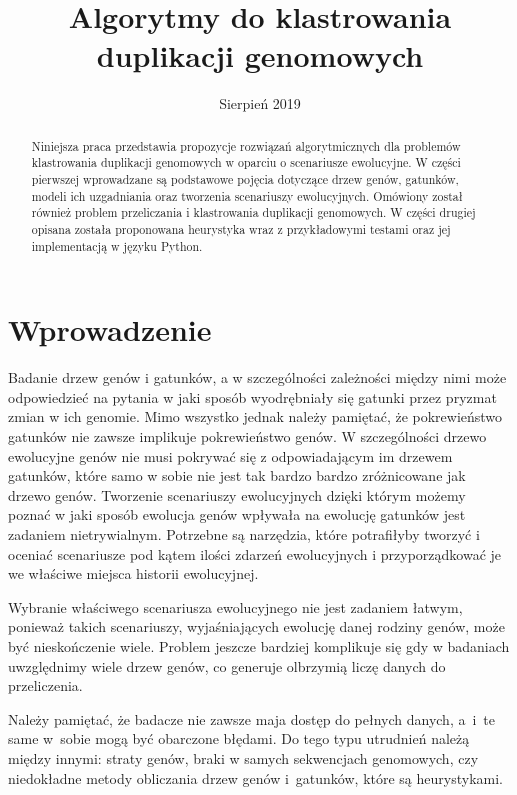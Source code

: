 \documentclass[licencjacka]{pracamgr}
\title{Algorytmy do klastrowania duplikacji genomowych}
\date{Sierpień 2019}
\begin{document}
\maketitle


\begin{abstract}
   Niniejsza praca przedstawia propozycje rozwiązań algorytmicznych dla problemów klastrowania duplikacji genomowych w oparciu o scenariusze ewolucyjne. W części pierwszej wprowadzane są podstawowe pojęcia dotyczące drzew genów, gatunków, modeli ich uzgadniania oraz tworzenia scenariuszy ewolucyjnych. Omówiony został również problem przeliczania i klastrowania duplikacji genomowych. W części drugiej opisana została proponowana heurystyka wraz z przykładowymi testami oraz jej implementacją w języku Python.
\end{abstract}


\renewcommand{\contentsname}{Spis Treści}
\tableofcontents

\chapter*{Wprowadzenie}


Badanie drzew genów i gatunków, a w szczególności zależności między nimi może odpowiedzieć na pytania w jaki sposób wyodrębniały się gatunki przez pryzmat zmian w ich genomie. Mimo wszystko jednak należy pamiętać, że pokrewieństwo gatunków nie zawsze implikuje pokrewieństwo genów. W szczególności drzewo ewolucyjne genów nie musi pokrywać się z odpowiadającym im drzewem gatunków, które samo w sobie nie jest tak bardzo bardzo zróżnicowane jak drzewo genów. Tworzenie scenariuszy ewolucyjnych dzięki którym możemy poznać w jaki sposób ewolucja genów wpływała na ewolucję gatunków jest zadaniem nietrywialnym. Potrzebne są narzędzia, które potrafiłyby tworzyć i oceniać scenariusze pod kątem ilości zdarzeń ewolucyjnych i przyporządkować je we właściwe miejsca historii ewolucyjnej.

Wybranie właściwego scenariusza ewolucyjnego nie jest zadaniem łatwym, ponieważ takich scenariuszy, wyjaśniających ewolucję danej rodziny genów, może być nieskończenie wiele. Problem jeszcze bardziej komplikuje się gdy w badaniach uwzględnimy wiele drzew genów, co generuje olbrzymią liczę danych do przeliczenia.

Należy pamiętać, że badacze nie zawsze maja dostęp do pełnych danych, a~i~te same w~sobie mogą być obarczone błędami. Do tego typu utrudnień należą między innymi: straty genów, braki w samych sekwencjach genomowych, czy niedokładne metody obliczania drzew genów i~gatunków, które są heurystykami. 
\end{document}
